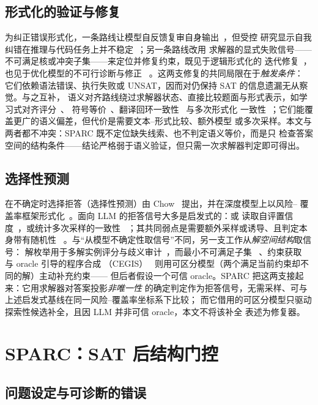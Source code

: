 \documentclass[letterpaper]{article}
\newcommand{\method}{SPARC}
\begin{document}
\subsection{形式化的验证与修复}
为纠正错误形式化，一条路线让模型自反馈复审自身输出~\cite{madaan2023,shinn2023}，但受控
研究显示自我纠错在推理与代码任务上并不稳定~\cite{huang2024,olausson2024}；另一条路线改用
求解器的显式失败信号——不可满足核或冲突子集——来定位并修复约束，既见于逻辑形式化的
迭代修复~\cite{kirtania2024,singh2026}，也见于优化模型的不可行诊断与修正
~\cite{chen2024optichat,zhang2025sacopt,ao2026}。这两支修复的共同局限在于\emph{触发条件}：
它们依赖语法错误、执行失败或 UNSAT，因而对仍保持 SAT 的信息遗漏无从察觉。与之互补，
语义对齐路线绕过求解器状态、直接比较题面与形式表示，如学习式对齐评分~\cite{lu2025}、
符号等价~\cite{li2024symbolic}、翻译回环一致性~\cite{ryu2025,zhou2024dtv} 与多次形式化
一致性~\cite{raza2025}；它们能覆盖更广的语义偏差，但代价是需要文本--形式比较、额外模型
或多次采样。本文与两者都不冲突：\method{} 既不定位缺失线索、也不判定语义等价，而是只
检查答案空间的结构条件——结论严格弱于语义验证，但只需一次求解器判定即可得出。

\subsection{选择性预测}
在不确定时选择拒答（选择性预测）由 Chow~\cite{chow1957} 提出，并在深度模型上以风险--
覆盖率框架形式化~\cite{geifman2017,kamath2020}。面向 LLM 的拒答信号大多是启发式的：或
读取自评置信度~\cite{xiong2024,zhang2024rtuning}，或统计多次采样的一致性
~\cite{wang2023,manakul2023}；其共同弱点是需要额外采样或诱导、且判定本身带有随机性
~\cite{wen2024}。与“从模型不确定性取信号”不同，另一支工作从\emph{解空间结构}取信号：
解枚举用于多解实例评分与歧义审计~\cite{amonkar2025,hall2026}，而最小不可满足子集
~\cite{liffiton2008}、约束获取~\cite{bessiere2013,tsouros2024} 与 oracle 引导的程序合成
（CEGIS）~\cite{jha2010} 则用可区分模型（两个满足当前约束却不同的解）主动补充约束——
但后者假设一个可信 oracle。\method{} 把这两支接起来：它用求解器对答案投影\emph{非唯一性}
的确定判定作为拒答信号，无需采样、可与上述启发式基线在同一风险--覆盖率坐标系下比较；
而它借用的可区分模型只驱动探索性候选补全，且因 LLM 并非可信 oracle，本文不将该补全
表述为修复器。

\section{\method{}：SAT 后结构门控}
\label{sec:method}
\label{sec:problem}

\subsection{问题设定与可诊断的错误}
\label{sec:setting}
\end{document}
